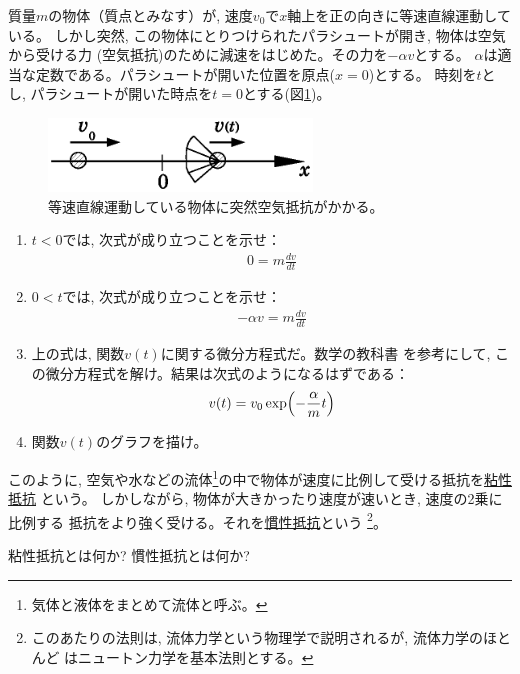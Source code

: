\begin{q}\label{q:parachute}
質量$m$の物体（質点とみなす）が, 速度$v_0$で$x$軸上を正の向きに等速直線運動している。
しかし突然, この物体にとりつけられたパラシュートが開き, 物体は空気から受ける力
(空気抵抗)のために減速をはじめた。その力を$-\alpha v$とする。
$\alpha$は適当な定数である。パラシュートが開いた位置を原点($x=0$)とする。
時刻を$t$とし, パラシュートが開いた時点を$t=0$とする(図\ref{fig:parachute})。
\begin{figure}[h]
    \centering
    \includegraphics[width=7cm]{parachute.eps}
    \caption{等速直線運動している物体に突然空気抵抗がかかる。}\label{fig:parachute}
\end{figure}
\begin{enumerate}
\item $t<0$では, 次式が成り立つことを示せ：
\begin{eqnarray}
0=m\frac{dv}{dt}\label{eq:friction_stop1}
\end{eqnarray}
\item $0<t$では, 次式が成り立つことを示せ：
\begin{eqnarray}
-\alpha v=m\frac{dv}{dt}\label{eq:friction_stop2}
\end{eqnarray}
\item 上の式は, 関数$v(t)$に関する微分方程式だ。数学の教科書
を参考にして, この微分方程式を解け。結果は次式のようになるはずである：
\begin{eqnarray}
v(t)=v_0\exp\Bigl(-\frac{\alpha}{m}t\Bigr)\label{eq:stop_viscosity}
\end{eqnarray}
\item 関数$v(t)$のグラフを描け。
\end{enumerate}
\end{q}

このように, 空気や水などの流体\footnote{気体と液体をまとめて流体と呼ぶ。}の中で物体が速度に比例して受ける抵抗を\underline{粘性抵抗}
という。
しかしながら, 物体が大きかったり速度が速いとき, 速度の2乗に比例する
抵抗をより強く受ける。それを\underline{慣性抵抗}という
\footnote{このあたりの法則は, 流体力学という物理学で説明されるが, 流体力学のほとんど
はニュートン力学を基本法則とする。}。\mv

%
\begin{q}\label{q:resistance}
粘性抵抗とは何か? 慣性抵抗とは何か?
\end{q}

